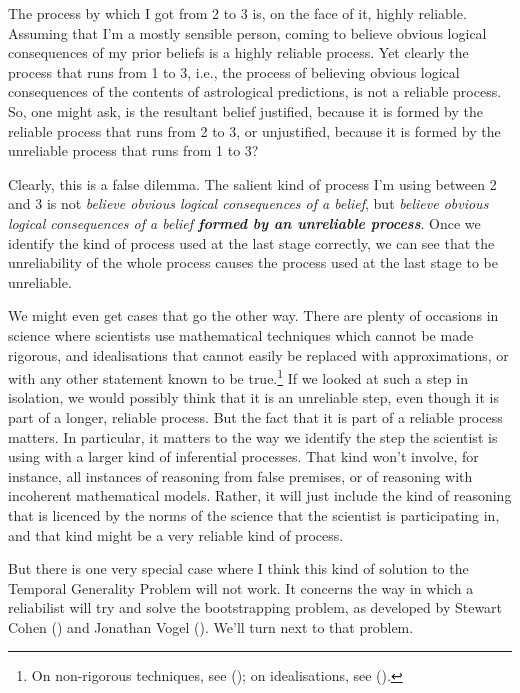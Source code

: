 \documentclass[
  11pt,
  letterpaper,
  DIV=11,
  numbers=noendperiod,
  twoside]{scrartcl}
\begin{document}
The process by which I got from 2 to 3 is, on the face of it, highly
reliable. Assuming that I'm a mostly sensible person, coming to believe
obvious logical consequences of my prior beliefs is a highly reliable
process. Yet clearly the process that runs from 1 to 3, i.e., the
process of believing obvious logical consequences of the contents of
astrological predictions, is not a reliable process. So, one might ask,
is the resultant belief justified, because it is formed by the reliable
process that runs from 2 to 3, or unjustified, because it is formed by
the unreliable process that runs from 1 to 3?

Clearly, this is a false dilemma. The salient kind of process I'm using
between 2 and 3 is not \emph{believe obvious logical consequences of a
belief}, but \emph{believe obvious logical consequences of a belief
\textbf{formed by an unreliable process}}. Once we identify the kind of
process used at the last stage correctly, we can see that the
unreliability of the whole process causes the process used at the last
stage to be unreliable.

We might even get cases that go the other way. There are plenty of
occasions in science where scientists use mathematical techniques which
cannot be made rigorous, and idealisations that cannot easily be
replaced with approximations, or with any other statement known to be
true.\footnote{On non-rigorous techniques, see
  (); on idealisations, see
  ().} If we looked at such a step
in isolation, we would possibly think that it is an unreliable step,
even though it is part of a longer, reliable process. But the fact that
it is part of a reliable process matters. In particular, it matters to
the way we identify the step the scientist is using with a larger kind
of inferential processes. That kind won't involve, for instance, all
instances of reasoning from false premises, or of reasoning with
incoherent mathematical models. Rather, it will just include the kind of
reasoning that is licenced by the norms of the science that the
scientist is participating in, and that kind might be a very reliable
kind of process.

But there is one very special case where I think this kind of solution
to the Temporal Generality Problem will not work. It concerns the way in
which a reliabilist will try and solve the bootstrapping problem, as
developed by Stewart Cohen () and Jonathan
Vogel (). We'll turn next to that problem.
\end{document}
